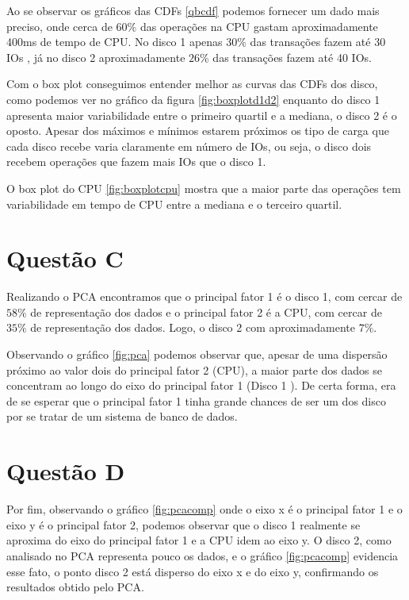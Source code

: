 \documentclass[11pt,a4paper,openany,oneside]{abntex2}
\begin{document}
Ao se observar os gráficos das CDFs \ref{qbcdf} podemos  fornecer um dado mais preciso, onde cerca de $60\%$ das operações na CPU  gastam aproximadamente 400ms de tempo de CPU.
No disco 1 apenas $30\%$ das transações fazem até 30 IOs , já no disco 2 aproximadamente $26\%$ das transações fazem até 40 IOs.

 Com o box plot conseguimos entender melhor as curvas das CDFs dos disco, como podemos ver no gráfico da figura \ref{fig:boxplotd1d2} enquanto do disco 1 apresenta maior variabilidade entre o primeiro quartil e a mediana, o disco 2 é o oposto. Apesar dos máximos e mínimos estarem próximos os tipo de carga que cada disco recebe varia claramente em número de IOs, ou seja, o disco dois recebem operações que fazem mais IOs que o disco 1.
 
 O box plot do CPU \ref{fig:boxplotcpu} mostra que a maior parte das operações tem variabilidade em tempo de CPU entre a mediana e o terceiro quartil.



\section{Questão C}
\label{qec}

Realizando o PCA encontramos que o principal fator 1 é o disco 1, com cercar de $58\%$ de representação dos dados e o principal fator 2 é a CPU, com cercar de $35\%$ de representação dos dados. Logo, o disco 2 com aproximadamente $7\%$.

Observando o gráfico \ref{fig:pca} podemos observar que, apesar de uma dispersão próximo ao valor dois do principal fator 2 (CPU), a maior parte dos dados se concentram ao longo do eixo do principal fator 1 (Disco 1 ). De certa forma, era de se esperar que o principal fator 1 tinha grande chances de ser um dos disco por se tratar de um sistema de banco de dados.


\section{Questão D}
\label{qed}

Por fim, observando o gráfico \ref{fig:pcacomp} onde o eixo x é o principal fator 1 e o eixo y é o principal fator 2, podemos observar que o disco 1 realmente se aproxima do eixo do principal fator 1 e a CPU idem ao eixo y. O disco 2, como analisado no PCA representa pouco os dados, e o gráfico \ref{fig:pcacomp} evidencia esse fato, o ponto disco 2 está disperso do eixo x e do eixo y, confirmando os resultados obtido pelo PCA.
\end{document}

